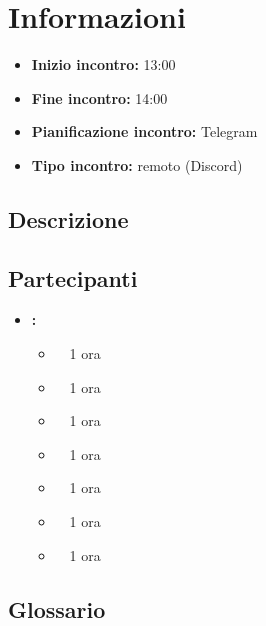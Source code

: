 \section{Informazioni}
\begin{itemize}
	\item \textbf{Inizio incontro:} 13:00
	\item \textbf{Fine incontro:} 14:00
	\item \textbf{Pianificazione incontro:} Telegram
	\item \textbf{Tipo incontro:} remoto (Discord)
\end{itemize}

\subsection{Descrizione}
\DocDescription

\subsection{Partecipanti}

\begin{itemize}
	\item \textbf{\GroupName:}
	\begin{itemize}
		\item \tommaso \ \rightarrow\ 1 ora
		\item \marco \ \rightarrow\ 1 ora
		\item \riccardo \ \rightarrow\ 1 ora
		\item \raul \ \rightarrow\ 1 ora
		\item \martina \ \rightarrow\ 1 ora
		\item \sebastiano \ \rightarrow\ 1 ora
		\item \mattia \ \rightarrow\ 1 ora
	\end{itemize}
\end{itemize}

\subsection{Glossario}
\GlossarioIntroduzione

\clearpage
